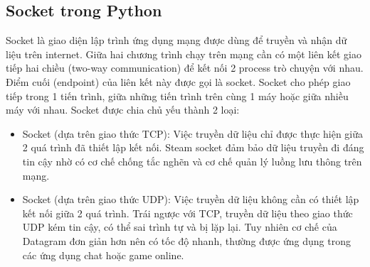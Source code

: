 \documentclass[a4paper]{article}
\begin{document}
\subsection{Socket trong Python}
Socket là giao diện lập trình ứng dụng mạng được dùng để truyền và nhận dữ liệu trên internet. Giữa hai chương trình chạy trên mạng cần có một liên kết giao tiếp hai chiều (two-way communication) để kết nối 2 process trò chuyện với nhau. Điểm cuối (endpoint) của liên kết này được gọi là socket. Socket cho phép giao tiếp trong 1 tiến trình, giữa những tiến trình trên cùng 1 máy hoặc giữa nhiều máy với nhau. Socket được chia chủ yếu thành 2 loại:
\begin{itemize}
 \item Socket (dựa trên giao thức TCP): Việc truyền dữ liệu chỉ được thực hiện giữa 2 quá trình đã thiết lập kết nối. Steam socket đảm bảo dữ liệu truyền đi đáng tin cậy nhờ có cơ chế chống tắc nghẽn và cơ chế quản lý luồng lưu thông trên mạng.
 \item Socket (dựa trên giao thức UDP): Việc truyền dữ liệu không cần có thiết lập kết nối giữa 2 quá trình. Trái ngược với TCP, truyền dữ liệu theo giao thức UDP kém tin cậy, có thể sai trình tự và bị lặp lại. Tuy nhiên cơ chế của Datagram đơn giản hơn nên có tốc độ nhanh, thường được ứng dụng trong các ứng dụng chat hoặc game online.
 \end{itemize}
\end{document}
